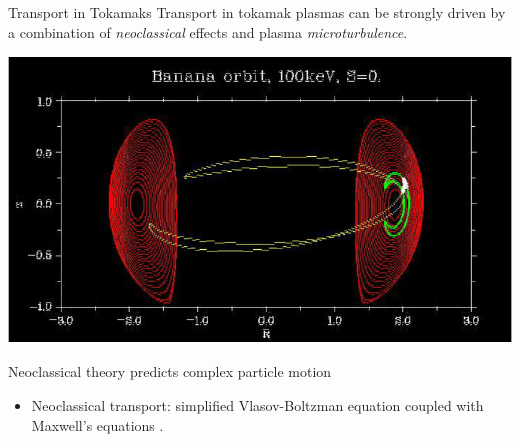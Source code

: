 \documentclass[11pt]{beamer}
\begin{document}
\begin{frame}

\begin{block}{Transport in Tokamaks}
Transport in tokamak plasmas can be strongly driven by a combination of {\em neoclassical} effects
and plasma {\em microturbulence}.
\end{block}



\centerline{\includegraphics[width=.6\textwidth]{banana_orbit.png}}

\centerline{Neoclassical theory predicts complex particle motion}

\begin{itemize}
\item Neoclassical transport:  simplified Vlasov-Boltzman equation coupled with Maxwell's equations \footnotemark[1].
\end{itemize}


\end{frame}
\end{document}
